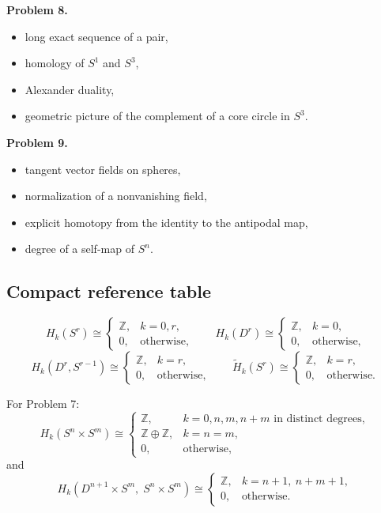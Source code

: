 \documentclass[12pt,a4paper]{article}
\theoremstyle{notespace}
\begin{document}
\textbf{Problem 8.}
\begin{itemize}
	\item long exact sequence of a pair,
	\item homology of \(S^1\) and \(S^3\),
	\item Alexander duality,
	\item geometric picture of the complement of a core circle in \(S^3\).
\end{itemize}

\textbf{Problem 9.}
\begin{itemize}
	\item tangent vector fields on spheres,
	\item normalization of a nonvanishing field,
	\item explicit homotopy from the identity to the antipodal map,
	\item degree of a self-map of \(S^n\).
\end{itemize}

\subsection{Compact reference table}

\[
H_k(S^r)\cong
\begin{cases}
	\mathbb Z, & k=0,r,\\
	0, & \text{otherwise},
\end{cases}
\qquad
H_k(D^r)\cong
\begin{cases}
	\mathbb Z, & k=0,\\
	0, & \text{otherwise},
\end{cases}
\]
\[
H_k(D^{r},S^{r-1})\cong
\begin{cases}
	\mathbb Z, & k=r,\\
	0, & \text{otherwise},
\end{cases}
\qquad
\widetilde H_k(S^r)\cong
\begin{cases}
	\mathbb Z, & k=r,\\
	0, & \text{otherwise}.
\end{cases}
\]

For Problem 7:
\[
H_k(S^n\times S^m)\cong
\begin{cases}
	\mathbb Z, & k=0,n,m,n+m \text{ in distinct degrees},\\
	\mathbb Z\oplus \mathbb Z, & k=n=m,\\
	0, & \text{otherwise},
\end{cases}
\]
and
\[
H_k(D^{n+1}\times S^m,\; S^n\times S^m)\cong
\begin{cases}
	\mathbb Z, & k=n+1,\ n+m+1,\\
	0, & \text{otherwise}.
\end{cases}
\]
\end{document}
